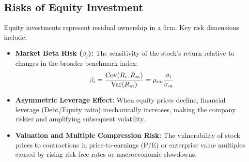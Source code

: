 \subsection{Risks of Equity Investment}

Equity investments represent residual ownership in a firm. Key risk dimensions include:
\begin{itemize}[leftmargin=1.5em, itemsep=2pt]
    \item \textbf{Market Beta Risk ($\beta_i$):} The sensitivity of the stock's return relative to changes in the broader benchmark index:
    \begin{equation}
    \beta_i = \frac{\operatorname{Cov}(R_i, R_m)}{\operatorname{Var}(R_m)} = \rho_{im} \frac{\sigma_i}{\sigma_m}
    \end{equation}
    \item \textbf{Asymmetric Leverage Effect:} When equity prices decline, financial leverage (Debt/Equity ratio) mechanically increases, making the company riskier and amplifying subsequent volatility.
    \item \textbf{Valuation and Multiple Compression Risk:} The vulnerability of stock prices to contractions in price-to-earnings (P/E) or enterprise value multiples caused by rising risk-free rates or macroeconomic slowdowns.
\end{itemize}

